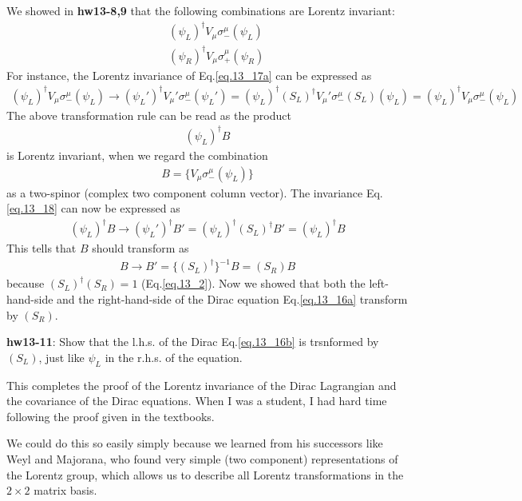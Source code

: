 \documentclass[12pt]{article}
\begin{document}
  We showed in {\bf hw13-8,9} that the following combinations are Lorentz
  invariant:
\begin{eqnarray}
&& (\psi_L)^\dagger V_\mu \sigma_-^\mu (\psi_L) \label{eq.13_17a}\\ 
&&(\psi_R)^\dagger V_\mu \sigma_+^\mu (\psi_R)  \label{eq.13_17b}
\end{eqnarray}
  For instance, the Lorentz invariance of Eq.\ref{eq.13_17a} can be expressed as
\begin{eqnarray}
  (\psi_L)^\dagger V_\mu  \sigma_-^\mu  (\psi_L)
  \to (\psi_L')^\dagger V_\mu' \sigma_-^\mu (\psi_L')
  = (\psi_L)^\dagger (S_L)^\dagger V_\mu' \sigma_-^\mu (S_L) (\psi_L)
  = (\psi_L)^\dagger V_\mu  \sigma_-^\mu   (\psi_L) \label{eq.13_18}
\end{eqnarray}
  The above transformation rule can be read as the product
\begin{eqnarray}
  (\psi_L)^\dagger B \label{eq.13_19}
\end{eqnarray}
  is Lorentz invariant, when we regard the combination
\begin{eqnarray}
  B = \{V_\mu  \sigma_-^\mu  (\psi_L)\} \label{eq.13_20}
\end{eqnarray}
  as a two-spinor (complex two component column vector).  The invariance
  Eq.\ref{eq.13_18} can now be expressed as
\begin{eqnarray}
  (\psi_L)^\dagger B \to (\psi_L')^\dagger  B'
    = (\psi_L)^\dagger (S_L)^\dagger B'
    = (\psi_L)^\dagger B \label{eq.13_21}
\end{eqnarray}
  This tells that $B$ should transform as
\begin{eqnarray}
  B \to B' = \{(S_L)^\dagger\}^{-1} B = (S_R) B \label{eq.13_22}
\end{eqnarray}
  because $(S_L)^\dagger (S_R) = 1$ (Eq.\ref{eq.13_2}). Now we showed that both the left-hand-side and the right-hand-side of the Dirac equation Eq.\ref{eq.13_16a} transform by $(S_R)$.

{\bf hw13-11}: Show that the l.h.s. of the Dirac Eq.\ref{eq.13_16b} is trsnformed by $(S_L)$, just like $\psi_L$ in the r.h.s. of the equation.

  This completes the proof of the Lorentz invariance of the Dirac
  Lagrangian and the covariance of the Dirac equations.  When I was a
  student, I had hard time following the proof given in the textbooks.

  We could do this so easily simply because we learned from his successors
  like Weyl and Majorana, who found very simple (two component)
  representations of the Lorentz group, which allows us to describe all
  Lorentz transformations in the $2 \times 2$ matrix basis.
\end{document}
